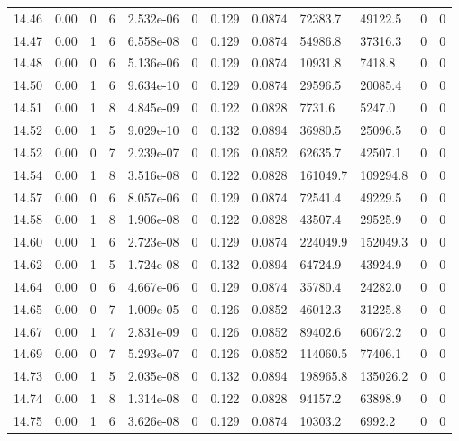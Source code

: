 \documentclass[preview]{standalone}
\begin{document}
{{{{{{{{{{{{{{{{{{\begin{tabular}{L{1.2cm}C{1.2cm} C{0.3cm}C{0.5cm} C{1.4cm}C{1.4cm} C{1.4cm}C{1.4cm} C{1.6cm}C{1.6cm} C{1.6cm}C{1.6cm}}
  14.46  &  0.00  & 0     &  6 &  2.532e-06  & 0  &  0.129&   0.0874& 72383.7 & 49122.5   &  0 & 0  \\ 
  14.47  &  0.00  & 1     &  6 &  6.558e-08  & 0  &  0.129&   0.0874& 54986.8 & 37316.3   &  0 & 0  \\ 
  14.48  &  0.00  & 0     &  6 &  5.136e-06  & 0  &  0.129&   0.0874& 10931.8 & 7418.8   &  0 & 0  \\ 
  14.50  &  0.00  & 1     &  6 &  9.634e-10  & 0  &  0.129&   0.0874& 29596.5 & 20085.4   &  0 & 0  \\ 
  14.51  &  0.00  & 1     &  8 &  4.845e-09  & 0  &  0.122&   0.0828& 7731.6 & 5247.0   &  0 & 0  \\ 
  14.52  &  0.00  & 1     &  5 &  9.029e-10  & 0  &  0.132&   0.0894& 36980.5 & 25096.5   &  0 & 0  \\ 
  14.52  &  0.00  & 0     &  7 &  2.239e-07  & 0  &  0.126&   0.0852& 62635.7 & 42507.1   &  0 & 0  \\ 
  14.54  &  0.00  & 1     &  8 &  3.516e-08  & 0  &  0.122&   0.0828& 161049.7 & 109294.8   &  0 & 0  \\ 
  14.57  &  0.00  & 0     &  6 &  8.057e-06  & 0  &  0.129&   0.0874& 72541.4 & 49229.5   &  0 & 0  \\ 
  14.58  &  0.00  & 1     &  8 &  1.906e-08  & 0  &  0.122&   0.0828& 43507.4 & 29525.9   &  0 & 0  \\ 
  14.60  &  0.00  & 1     &  6 &  2.723e-08  & 0  &  0.129&   0.0874& 224049.9 & 152049.3   &  0 & 0  \\ 
  14.62  &  0.00  & 1     &  5 &  1.724e-08  & 0  &  0.132&   0.0894& 64724.9 & 43924.9   &  0 & 0  \\ 
  14.64  &  0.00  & 0     &  6 &  4.667e-06  & 0  &  0.129&   0.0874& 35780.4 & 24282.0   &  0 & 0  \\ 
  14.65  &  0.00  & 0     &  7 &  1.009e-05  & 0  &  0.126&   0.0852& 46012.3 & 31225.8   &  0 & 0  \\ 
  14.67  &  0.00  & 1     &  7 &  2.831e-09  & 0  &  0.126&   0.0852& 89402.6 & 60672.2   &  0 & 0  \\ 
  14.69  &  0.00  & 0     &  7 &  5.293e-07  & 0  &  0.126&   0.0852& 114060.5 & 77406.1   &  0 & 0  \\ 
  14.73  &  0.00  & 1     &  5 &  2.035e-08  & 0  &  0.132&   0.0894& 198965.8 & 135026.2   &  0 & 0  \\ 
  14.74  &  0.00  & 1     &  8 &  1.314e-08  & 0  &  0.122&   0.0828& 94157.2 & 63898.9   &  0 & 0  \\ 
  14.75  &  0.00  & 1     &  6 &  3.626e-08  & 0  &  0.129&   0.0874& 10303.2 & 6992.2   &  0 & 0  \\ 

\end{tabular}}}}}}}}}}}}}}}}}}}
\end{document}
